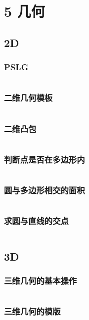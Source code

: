 \documentclass{article}
\begin{document}
\section{5 几何}
\subsection{2D}
\subsubsection{PSLG}
\inputminted{c++}{/home/zzuzxy/t3/ACM-template/5 几何/2D/PSLG.cpp}
\subsubsection{二维几何模板}
\inputminted{c++}{/home/zzuzxy/t3/ACM-template/5 几何/2D/二维几何模板.cpp}
\subsubsection{二维凸包}
\inputminted{c++}{/home/zzuzxy/t3/ACM-template/5 几何/2D/二维凸包.cpp}
\subsubsection{判断点是否在多边形内}
\inputminted{c++}{/home/zzuzxy/t3/ACM-template/5 几何/2D/判断点是否在多边形内.cpp}
\subsubsection{圆与多边形相交的面积}
\inputminted{c++}{/home/zzuzxy/t3/ACM-template/5 几何/2D/圆与多边形相交的面积.cpp}
\subsubsection{求圆与直线的交点}
\inputminted{c++}{/home/zzuzxy/t3/ACM-template/5 几何/2D/求圆与直线的交点.cpp}
\subsection{3D}
\subsubsection{三维几何的基本操作}
\inputminted{c++}{/home/zzuzxy/t3/ACM-template/5 几何/3D/三维几何的基本操作.cpp}
\subsubsection{三维几何的模版}
\inputminted{c++}{/home/zzuzxy/t3/ACM-template/5 几何/3D/三维几何的模版.cpp}
\end{document}
